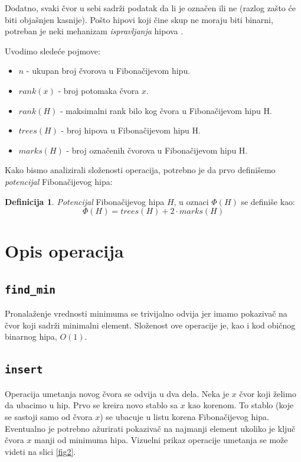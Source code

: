 \documentclass[a4paper]{article}
\theoremstyle{plain}
\theoremstyle{definition}
\newtheorem{defn}[thm]{Definicija} %
\begin{document}
Dodatno, svaki \v{c}vor u sebi sadr\v{z}i podatak da li je ozna\v{c}en ili ne (razlog za\v{s}to \'c{}e biti obja\v{s}njen kasnije). Po\v{s}to hipovi koji \v{c}ine skup ne moraju biti binarni, potreban je neki mehanizam \emph{ispravljanja} hipova \cite{Slides}.

Uvodimo slede\'c{}e pojmove:
\begin{itemize}
    \item $n$ - ukupan broj \v{c}vorova u Fibona\v{c}ijevom hipu.
    \item $rank(x)$ - broj potomaka \v{c}vora $x$.
    \item $rank(H)$ - maksimalni rank bilo kog \v{c}vora u Fibona\v{c}ijevom hipu H.
    \item $trees(H)$ - broj hipova u Fibona\v{c}ijevom hipu H.
    \item $marks(H)$ - broj ozna\v{c}enih \v{c}vorova u Fibona\v{c}ijevom hipu H.
\end{itemize}

Kako bismo analizirali slo\v{z}enosti operacija, potrebno je da prvo defini\v{s}emo \emph{potencijal} Fibona\v{c}ijevog hipa:

\begin{defn}
    \emph{Potencijal} Fibona\v{c}ijevog hipa $H$, u oznaci $\Phi(H)$ se defini\v{s}e kao:
    $$\Phi(H) = trees(H) + 2 \cdot marks(H)$$
\end{defn}


\section{Opis operacija}
\label{sec:Operacije}

\subsection{\texttt{find\_min}}
\label{subsec:findmin}

Pronala\v{z}enje vrednosti minimuma se trivijalno odvija jer imamo pokaziva\v{c} na \v{c}vor koji sadr\v{z}i minimalni element. Slo\v{z}enost ove operacije je, kao i kod obi\v{c}nog binarnog hipa, $O(1)$.

\subsection{\texttt{insert}}
\label{subsec:insert}

Operacija umetanja novog \v{c}vora se odvija u dva dela. Neka je $x$ \v{c}vor koji \v{z}elimo da ubacimo u hip. Prvo se kreira novo stablo sa $x$ kao korenom. To stablo (koje se sastoji samo od \v{c}vora $x$) se ubacuje u listu korena Fibona\v{c}ijevog hipa. Eventualno je potrebno a\v{z}urirati pokaziva\v{c} na najmanji element ukoliko je klju\v{c} \v{c}vora $x$ manji od minimuma hipa. Vizuelni prikaz operacije umetanja se mo\v{z}e videti na slici \ref{fig2}.
\end{document}
